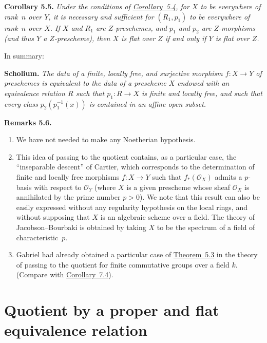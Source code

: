 \documentclass{article}
\newenvironment{itenv}[1]
  {\phantomsection\par\medskip\noindent\textbf{#1.}\itshape}
  {\medskip}
\newenvironment{rmenv}[1]
  {\phantomsection\par\medskip\noindent\textbf{#1.}\rmfamily}
  {\medskip}
\renewcommand{\cal}[1]{{\mathcal{#1}}}
\begin{document}
\begin{itenv}{Corollary 5.5}
  Under the conditions of \hyperref[corollary5.4]{Corollary~5.4}, for $X$ to be everywhere of rank~$n$ over $Y$, it is necessary and sufficient for $(R_1,p_1)$ to be everywhere of rank~$n$ over $X$.
  If $X$ and $R_1$ are $Z$-preschemes, and $p_1$ and $p_2$ are $Z$-morphisms (and thus $Y$ a $Z$-prescheme), then $X$ is flat over $Z$ if and only if $Y$ is flat over $Z$.
\end{itenv}

In summary:

\begin{itenv}{Scholium}
  The data of a finite, locally free, and surjective morphism $f\colon X\to Y$ of preschemes is equivalent to the data of a prescheme $X$ endowed with an equivalence relation $R$ such that $p_1\colon R\to X$ is finite and locally free, and such that every class $p_2(p_1^{-1}(x))$ is contained in an affine open subset.
\end{itenv}

\begin{rmenv}{Remarks 5.6}
  \begin{enumerate}
    \item We have not needed to make any Noetherian hypothesis.
    \item This idea of passing to the quotient contains, as a particular case, the ``inseparable descent'' of Cartier, which corresponds to the determination of finite and locally free morphisms $f\colon X\to Y$ such that $f_*(\cal{O}_X)$ admits a $p$-basis with respect to $\cal{O}_Y$ (where $X$ is a given prescheme whose sheaf $\cal{O}_X$ is annihilated by the prime number $p>0$).
      We note that this result can also be easily expressed without any regularity hypothesis on the local rings, and without supposing that $X$ is an algebraic scheme over a field.
      The theory of Jacobson--Bourbaki is obtained by taking $X$ to be the spectrum of a field of characteristic~$p$.
      \item Gabriel had already obtained a particular case of \hyperref[theorem5.3]{Theorem~5.3} in the theory of passing to the quotient for finite commutative groups over a field $k$.
        (Compare with \hyperref[corollary7.4]{Corollary~7.4}).
  \end{enumerate}
\end{rmenv}


\section{Quotient by a proper and flat equivalence relation}
\label{6}
\end{document}
